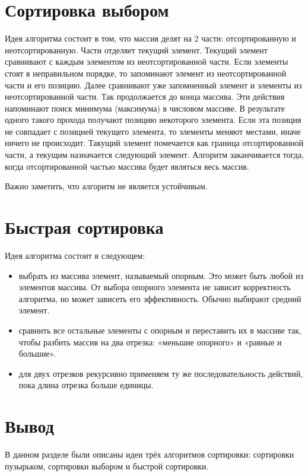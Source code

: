 \documentclass{report}
\begin{document}
\section{Сортировка выбором}

Идея алгоритма состоит в том, что массив делят на 2 части: отсортированную и неотсортированную. Части отделяет текущий элемент. Текущий элемент сравнивают с каждым элементом из неотсортированной части. Если элементы стоят в неправильном порядке, то запоминают элемент из неотсортированной части и его позицию. Далее сравнивают уже запомненный элемент и элементы из неотсортированной части. Так продолжается до конца массива. Эти действия напоминают поиск минимума (максимума) в числовом массиве. В результате одного такого прохода получают позицию некоторого элемента. Если эта позиция не совпадает с позицией текущего элемента, то элементы меняют местами, иначе ничего не происходит. Такущий элемент помечается как граница отсортированной части, а текущим назначается следующий элемент. Алгоритм заканчивается тогда, когда отсортированной частью массива будет являться весь массив. 

Важно заметить, что алгоритм не является устойчивым.

\section{Быстрая сортировка}

Идея алгоритма состоит в следующем:

\begin{itemize}
	\item выбрать из массива элемент, называемый опорным. Это может быть любой из элементов массива. От выбора опорного элемента не зависит корректность алгоритма, но может зависеть его эффективность. Обычно выбирают средний элемент.
	\item сравнить все остальные элементы с опорным и переставить их в массиве так, чтобы разбить массив на два отрезка: «меньшие опорного» и «равные и большие».
	\item для двух отрезков рекурсивно применяем ту же последовательность действий, пока длина отрезка больше единицы.
\end{itemize}

\section{Вывод}

В данном разделе были описаны идеи трёх алгоритмов сортировки: сортировки пузырьком, сортировки выбором и быстрой сортировки.
	
\end{document}
